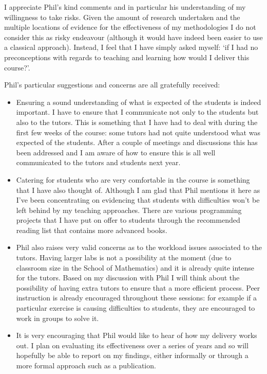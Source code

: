 \documentclass{article}
\begin{document}
I appreciate Phil's kind comments and in particular his understanding of my willingness to take risks. Given the amount of research undertaken and the multiple locations of evidence for the effectiveness of my methodologies I do not consider this as risky endeavour (although it would have indeed been easier to use a classical approach). Instead, I feel that I have simply asked myself: `if I had no preconceptions with regards to teaching and learning how would I deliver this course?'.

Phil's particular suggestions and concerns are all gratefully received:

\begin{itemize}
    \item Ensuring a sound understanding of what is expected of the students is indeed important. I have to ensure that I communicate not only to the students but also to the tutors. This is something that I have had to deal with during the first few weeks of the course: some tutors had not quite understood what was expected of the students. After a couple of meetings and discussions this has been addressed and I am aware of how to ensure this is all well communicated to the tutors and students next year.
    \item Catering for students who are very comfortable in the course is something that I have also thought of. Although I am glad that Phil mentions it here as I've been concentrating on evidencing that students with difficulties won't be left behind by my teaching approaches. There are various programming projects that I have put on offer to students through the recommended reading list that contains more advanced books.
    \item Phil also raises very valid concerns as to the workload issues associated to the tutors. Having larger labs is not a possibility at the moment (due to classroom size in the School of Mathematics) and it is already quite intense for the tutors. Based on my discussion with Phil I will think about the possibility of having extra tutors to ensure that a more efficient process. Peer instruction is already encouraged throughout these sessions: for example if a particular exercise is causing difficulties to students, they are encouraged to work in groups to solve it.
    \item It is very encouraging that Phil would like to hear of how my delivery works out. I plan on evaluating its effectiveness over a series of years and so will hopefully be able to report on my findings, either informally or through a more formal approach such as a publication.
\end{itemize}



\end{document}
